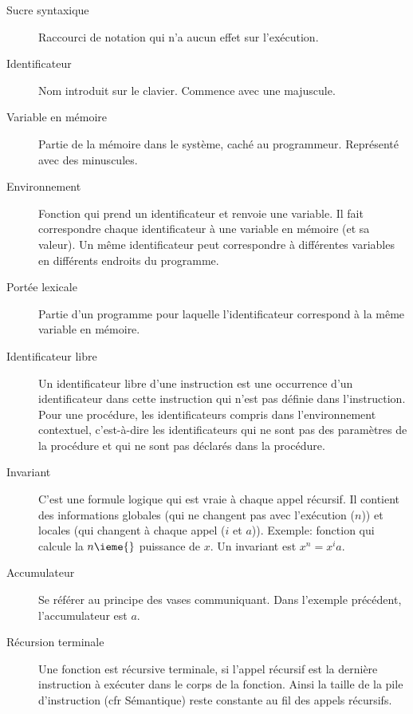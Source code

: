 \begin{description}
  \item[Sucre syntaxique]
    Raccourci de notation qui n'a aucun effet sur l'exécution.

  \item[Identificateur]
    Nom introduit sur le clavier. Commence avec une majuscule.

  \item[Variable en mémoire]
    Partie de la mémoire dans le système, caché au programmeur.
    Représenté avec des minuscules.

  \item[Environnement]
    Fonction qui prend un identificateur et renvoie une variable.
    Il fait correspondre chaque identificateur
    à une variable en mémoire (et sa valeur).
    Un même identificateur peut correspondre
    à différentes variables en différents endroits du programme.

  \item[Portée lexicale]
    Partie d'un programme pour laquelle l'identificateur
    correspond à la même variable en mémoire.

  \item[Identificateur libre]
    Un identificateur libre d’une instruction est
    une occurrence d’un identificateur dans
    cette instruction qui n’est pas définie dans l’instruction.
    Pour une procédure,
    les identificateurs compris dans l'environnement contextuel,
    c'est-à-dire les identificateurs qui ne sont pas des paramètres
    de la procédure et qui ne sont pas déclarés dans la procédure.

  \item[Invariant]
    C'est une formule logique qui est vraie à chaque appel récursif.
    Il contient des informations globales
    (qui ne changent pas avec l'exécution ($n$))
    et locales (qui changent à chaque appel ($i$ et $a$)).
    Exemple:
    fonction qui calcule la $n\ieme{}$ puissance de $x$.
    Un invariant est $x^n = x^ia$.

  \item[Accumulateur]
    Se référer au principe des vases communiquant.
    Dans l'exemple précédent, l'accumulateur est $a$.

  \item[Récursion terminale]
    Une fonction est récursive terminale,
    si l'appel récursif est la dernière instruction à exécuter
    dans le corps de la fonction.
    Ainsi la taille de la pile d'instruction
    (cfr Sémantique) reste constante au fil des appels récursifs.


\end{description}
